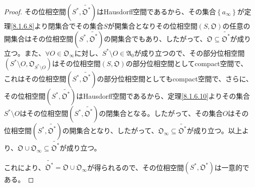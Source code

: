 \documentclass[dvipdfmx]{jsarticle}
\begin{document}
\begin{proof}
その位相空間$\left( S^{*},\widetilde{\mathfrak{O}^{*}} \right)$はHausdorff空間であるから、その集合$\left\{ a_{\infty} \right\}$が定理\ref{8.1.6.8}より閉集合でその集合$S$が開集合となりその位相空間$\left( S,\mathfrak{O} \right)$の任意の開集合はその位相空間$\left( S^{*},\widetilde{\mathfrak{O}^{*}} \right)$の開集合でもあり、したがって、$\mathfrak{O \subseteq}\widetilde{\mathfrak{O}^{*}}$が成り立つ。また、$\forall O \in \mathfrak{O}_{\infty}$に対し、$S^{*} \setminus O \in \mathfrak{A}_{0}$が成り立つので、その部分位相空間$\left( S^{*} \setminus O,\mathfrak{O}_{S^{*} \setminus O} \right)$はその位相空間$\left( S,\mathfrak{O} \right)$の部分位相空間としてcompact空間で、これはその位相空間$\left( S^{*},\widetilde{\mathfrak{O}^{*}} \right)$の部分位相空間としてもcompact空間で、さらに、その位相空間$\left( S^{*},\widetilde{\mathfrak{O}^{*}} \right)$はHausdorff空間であるから、定理\ref{8.1.6.10}よりその集合$S^{*} \setminus O$はその位相空間$\left( S^{*},\widetilde{\mathfrak{O}^{*}} \right)$の閉集合となる。したがって、その集合$O$はその位相空間$\left( S^{*},\widetilde{\mathfrak{O}^{*}} \right)$の開集合となり、したがって、$\mathfrak{O}_{\infty} \subseteq \widetilde{\mathfrak{O}^{*}}$が成り立つ。以上より、$\mathfrak{O \cup}\mathfrak{O}_{\infty} \subseteq \widetilde{\mathfrak{O}^{*}}$が成り立つ。\par
これにより、$\widetilde{\mathfrak{O}^{*}} = \mathfrak{O \cup}\mathfrak{O}_{\infty}$が得られるので、その位相空間$\left( S^{*},\mathfrak{O}^{*} \right)$は一意的である。
\end{proof}
\end{document}
